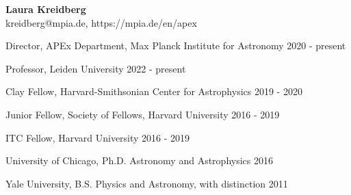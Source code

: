 \documentclass[12pt,letterpaper]{article}
\begin{document}
\thispagestyle{empty}\sloppy\sloppypar\raggedbottom

\textbf{\Large Laura Kreidberg}\\ 
\textsf{\small kreidberg@mpia.de, https://mpia.de/en/apex} \\[0.5ex]

\begin{list}{}{\cvlist}

    \item Director, APEx Department, Max Planck Institute for Astronomy \hfill 2020 - present \\
    \item Professor, Leiden University \hfill 2022 - present \\
    \item Clay Fellow, Harvard-Smithsonian Center for Astrophysics \hfill 2019 - 2020\\
    \item Junior Fellow, Society of Fellows, Harvard University \hfill 2016 - 2019\\
    \item ITC Fellow, Harvard University \hfill 2016 - 2019\\

\end{list}


\begin{list}{}{\cvlist}
    \item University of Chicago, Ph.D. Astronomy and Astrophysics \hfill 2016
    \item Yale University, B.S. Physics and Astronomy, with distinction \hfill 2011
\end{list}
\end{document}
